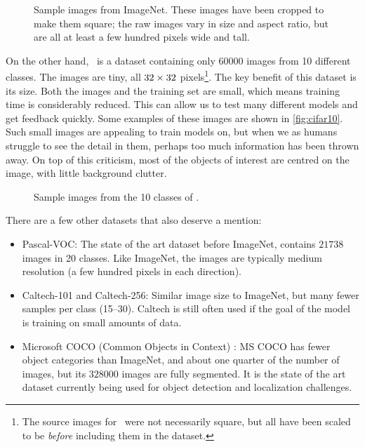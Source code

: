   \begin{figure}
    \centering
      \caption[Sample images from ImageNet]
      {Sample images from ImageNet. These images have been cropped to
      make them square; the raw images vary in size and aspect ratio, but are
      all at least a few hundred pixels wide and tall.}
      \label{fig:imagenet}
  \end{figure}

  On the other hand, \cifar\ is a dataset containing only $60000$ images from
  10 different classes. The images are tiny, all $32\times 32$ pixels\footnote{%
  The source images for \cifar\ were not necessarily square, but all have
  been scaled to be \emph{before} including them in the dataset.}.
  The key benefit of this dataset is its size. Both the images and the training
  set are small, which means training time is considerably reduced. This can
  allow us to test many different models and get feedback quickly. Some
  examples of these images are shown in \autoref{fig:cifar10}. Such small images are
  appealing to train models on, but when we as humans struggle to see the
  detail in them, perhaps too much information has been thrown away. On top of
  this criticism, most of the objects of interest are centred on the image,
  with little background clutter.

  \begin{figure} 
    \centering
      \caption[Sample images from \cifar] 
      {Sample images from the 10 classes of \cifar.}
      \label{fig:cifar10} 
  \end{figure}

  There are a few other datasets that also deserve a mention:
  \begin{itemize}
    \item Pascal-VOC: The state of the art dataset before ImageNet, contains
      $21738$ images in 20 classes. Like ImageNet, the images are typically
      medium resolution (a few hundred pixels in each direction).
    \item Caltech-101 and Caltech-256: Similar image size to ImageNet, but many
      fewer samples per class (15--30). Caltech is still often used if the
      goal of the model is training on small amounts of data.
    \item Microsoft COCO (Common Objects in Context)
      \citep{lin_microsoft_2014}: MS COCO
      has fewer object categories than ImageNet, and about one quarter of the
      number of images, but its $328000$ images are fully segmented.
      It is the state of the art dataset currently being used for object
      detection and localization challenges.
  \end{itemize}

